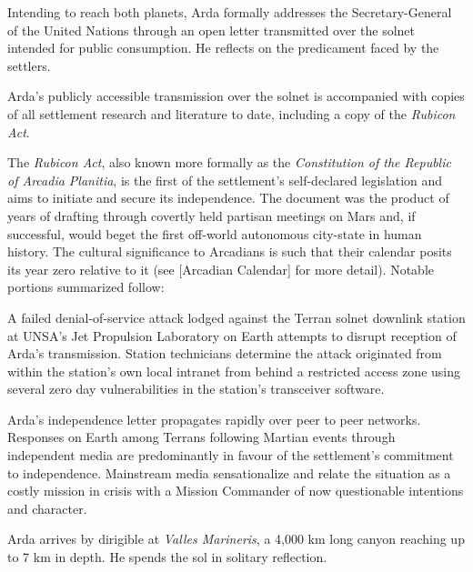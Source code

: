 Intending to reach both planets, Arda formally addresses the Secretary-General of the United Nations through an open letter transmitted over the solnet intended for public consumption. He reflects on the predicament faced by the settlers.

\startTimelineCorrespondenceDocument
    
\stopTimelineCorrespondenceDocument

Arda's publicly accessible transmission over the solnet is accompanied with copies of all settlement research and literature to date, including a copy of the {\it Rubicon Act}. 

The {\it Rubicon Act}, also known more formally as the {\it Constitution of the Republic of Arcadia Planitia}, is the first of the settlement's self-declared legislation and aims to initiate and secure its independence. The document was the product of years of drafting through covertly held partisan meetings on Mars and, if successful, would beget the first off-world autonomous city-state in human history. The cultural significance to Arcadians is such that their calendar posits its year zero relative to it (see [Arcadian Calendar] for more detail). Notable portions summarized follow:

\startTimelineGeneralDocument
    
\stopTimelineGeneralDocument

A failed denial-of-service attack lodged against the Terran solnet downlink station at UNSA's Jet Propulsion Laboratory on Earth attempts to disrupt reception of Arda's transmission. Station technicians determine the attack originated from within the station's own local intranet from behind a restricted access zone using several zero day vulnerabilities in the station's transceiver software.

Arda's independence letter propagates rapidly over peer to peer networks. Responses on Earth among Terrans following Martian events through independent media are predominantly in favour of the settlement's commitment to independence. Mainstream media sensationalize and relate the situation as a costly mission in crisis with a Mission Commander of now questionable intentions and character.
\StopTimelineDate

Arda arrives by dirigible at {\it Valles Marineris}, a 4,000 km long canyon reaching up to 7 km in depth. He spends the sol in solitary reflection.

